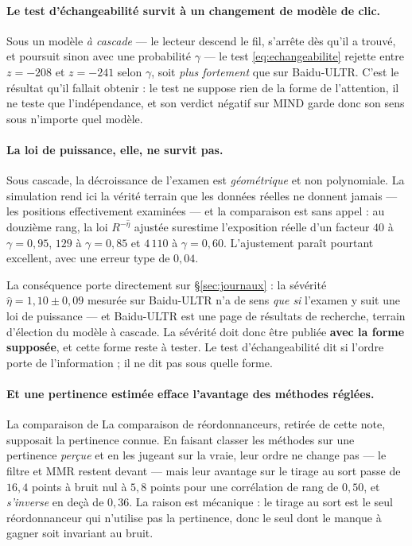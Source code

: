 \documentclass[11pt,a4paper]{article}
\begin{document}
\paragraph{Le test d'échangeabilité survit à un changement de modèle de clic.} Sous un modèle
\emph{à cascade} \citep{craswell2008} --- le lecteur descend le fil, s'arrête dès qu'il a trouvé, et poursuit sinon
avec une probabilité $\gamma$ --- le test \eqref{eq:echangeabilite} rejette entre $z = -208$ et
$z = -241$ selon $\gamma$, soit \emph{plus fortement} que sur Baidu-ULTR. C'est le résultat qu'il
fallait obtenir : le test ne suppose rien de la forme de l'attention, il ne teste que
l'indépendance, et son verdict négatif sur MIND garde donc son sens sous n'importe quel modèle.

\paragraph{La loi de puissance, elle, ne survit pas.} Sous cascade, la décroissance de l'examen
est \emph{géométrique} et non polynomiale. La simulation rend ici la vérité terrain que les
données réelles ne donnent jamais --- les positions effectivement examinées --- et la
comparaison est sans appel : au douzième rang, la loi $R^{-\hat\eta}$ ajustée surestime
l'exposition réelle d'un facteur $40$ à $\gamma = 0{,}95$, $129$ à $\gamma = 0{,}85$ et $4\,110$
à $\gamma = 0{,}60$. L'ajustement paraît pourtant excellent, avec une erreur type de $0{,}04$.

La conséquence porte directement sur \S\ref{sec:journaux} : la sévérité
$\hat\eta = 1{,}10 \pm 0{,}09$ mesurée sur Baidu-ULTR n'a de sens \emph{que si} l'examen y suit
une loi de puissance --- et Baidu-ULTR est une page de résultats de recherche, terrain d'élection
du modèle à cascade. La sévérité doit donc être publiée \textbf{avec la forme supposée}, et cette
forme reste à tester. Le test d'échangeabilité dit si l'ordre porte de l'information ; il ne dit
pas sous quelle forme.

\paragraph{Et une pertinence estimée efface l'avantage des méthodes réglées.} La comparaison de
La comparaison de réordonnanceurs, retirée de cette note, supposait la pertinence connue. En faisant classer les méthodes sur une
pertinence \emph{perçue} et en les jugeant sur la vraie, leur ordre ne change pas --- le filtre et
MMR restent devant --- mais leur avantage sur le tirage au sort passe de $16{,}4$ points à bruit
nul à $5{,}8$ points pour une corrélation de rang de $0{,}50$, et \emph{s'inverse} en deçà de
$0{,}36$. La raison est mécanique : le tirage au sort est le seul réordonnanceur qui n'utilise pas
la pertinence, donc le seul dont le manque à gagner soit invariant au bruit.
\end{document}
